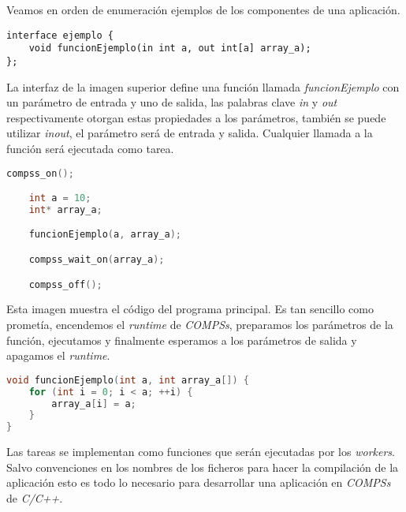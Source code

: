 Veamos en orden de enumeración ejemplos de los componentes de una aplicación.

\begin{minipage}{\linewidth}
\begin{lstlisting}[caption={Interfaz de la aplicación 'ejemplo'.},captionpos=b, label={lst:ejemplo.idl}, style=idlstyle]
interface ejemplo {
    void funcionEjemplo(in int a, out int[a] array_a);
};
\end{lstlisting}
\end{minipage}

La interfaz de la imagen superior define una función llamada \textit{funcionEjemplo} con un parámetro de entrada y uno de salida, las palabras clave \textit{in} y \textit{out} respectivamente otorgan estas propiedades a los parámetros, también se puede utilizar \textit{inout}, el parámetro será de entrada y salida. Cualquier llamada a la función será ejecutada como tarea.\smallskip

\begin{minipage}{\linewidth}
\begin{lstlisting}[caption={Fracción del código del programa principal}, captionpos=b, label={lst:ejemplo.cc}, language=C++]
    compss_on();

    int a = 10;
    int* array_a;

    funcionEjemplo(a, array_a);

    compss_wait_on(array_a);

    compss_off();
\end{lstlisting}
\end{minipage}

Esta imagen muestra el código del programa principal. Es tan sencillo como prometía, encendemos el \textit{runtime} de \textit{COMPSs}, preparamos los parámetros de la función, ejecutamos y finalmente esperamos a los parámetros de salida y apagamos el \textit{runtime}. \smallskip

\begin{minipage}{\linewidth}
\begin{lstlisting}[caption={Implementación de la función 'funcionEjemplo'}, captionpos=b, label={lst:ejemplo-functions.cc}, language=C++]
void funcionEjemplo(int a, int array_a[]) {
    for (int i = 0; i < a; ++i) {
        array_a[i] = a;
    }
}
\end{lstlisting}
\end{minipage}

Las tareas se implementan como funciones que serán ejecutadas por los \textit{workers}. Salvo convenciones en los nombres de los ficheros para hacer la compilación de la aplicación esto es todo lo necesario para desarrollar una aplicación en \textit{COMPSs} de \textit{C/C++}.

